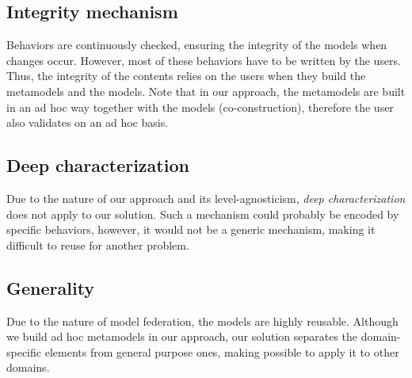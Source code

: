   \subsection{Integrity mechanism}


  Behaviors are continuously checked, ensuring the integrity of the models when
  changes occur. However, most of these behaviors have to be written by the
  users. Thus, the integrity of the contents relies on the users when they
  build the metamodels and the models.  Note that in our approach, the
  metamodels are built in an ad hoc way together with the models
  (co-construction), therefore the user also validates on an ad hoc basis.

  \subsection{Deep characterization}


  Due to the nature of our approach and its level-agnosticism, \emph{deep characterization} does not
  apply to our solution. Such a mechanism could probably be encoded by specific behaviors, however,
  it would not be a generic mechanism, making it difficult to reuse for another problem.

  \subsection{Generality}


  Due to the nature of model federation, the models are highly reusable.
  Although we build ad hoc metamodels in our approach, our solution separates
  the domain-specific elements from general purpose ones, making possible to
  apply it to other domains.

